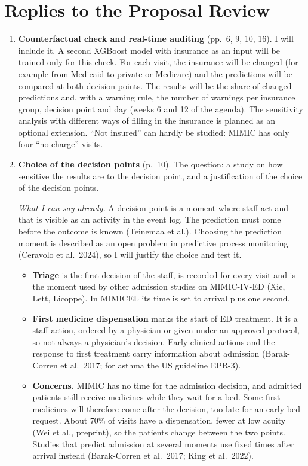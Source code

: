 \section{Replies to the Proposal Review}\label{section::review_replies}

\begin{enumerate}
  \item \textbf{Counterfactual check and real-time auditing} (pp.~6, 9, 10, 16). I will include it. A second XGBoost model with insurance as an input will be trained only for this check. For each visit, the insurance will be changed (for example from Medicaid to private or Medicare) and the predictions will be compared at both decision points. The results will be the share of changed predictions and, with a warning rule, the number of warnings per insurance group, decision point and day (weeks 6 and 12 of the agenda). The sensitivity analysis with different ways of filling in the insurance is planned as an optional extension. ``Not insured'' can hardly be studied: MIMIC has only four ``no charge'' visits.

  \item \textbf{Choice of the decision points} (p.~10). The question: a study on how sensitive the results are to the decision point, and a justification of the choice of the decision points.

  \textit{What I can say already.} A decision point is a moment where staff act and that is visible as an activity in the event log. The prediction must come before the outcome is known (Teinemaa et al.). Choosing the prediction moment is described as an open problem in predictive process monitoring (Ceravolo et al.\ 2024), so I will justify the choice and test it.
  \begin{itemize}
    \item \textbf{Triage} is the first decision of the staff, is recorded for every visit and is the moment used by other admission studies on MIMIC-IV-ED (Xie, Lett, Licoppe). In MIMICEL its time is set to arrival plus one second.
    \item \textbf{First medicine dispensation} marks the start of ED treatment. It is a staff action, ordered by a physician or given under an approved protocol, so not always a physician's decision. Early clinical actions and the response to first treatment carry information about admission (Barak-Corren et al.\ 2017; for asthma the US guideline EPR-3).
    \item \textbf{Concerns.} MIMIC has no time for the admission decision, and admitted patients still receive medicines while they wait for a bed. Some first medicines will therefore come after the decision, too late for an early bed request. About 70\% of visits have a dispensation, fewer at low acuity (Wei et al., preprint), so the patients change between the two points. Studies that predict admission at several moments use fixed times after arrival instead (Barak-Corren et al.\ 2017; King et al.\ 2022).
  \end{itemize}


\end{enumerate}
